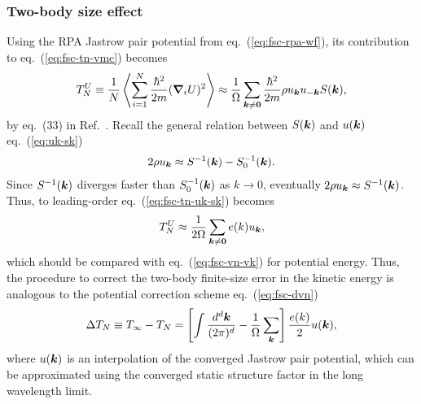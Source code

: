 \subsubsection{Two-body size effect}
Using the RPA Jastrow pair potential from eq.~(\ref{eq:fsc-rpa-wf}), its contribution to eq.~(\ref{eq:fsc-tn-vmc}) becomes
\begin{align} \label{eq:fsc-tn-uk-sk}
T^U_N \equiv \dfrac{1}{N}\left\langle
\sum\limits_{i=1}^N \dfrac{\hbar^2}{2m} (\boldsymbol{\nabla}_iU)^2
\right\rangle
\approx \frac{1}{\Omega} \sum\limits_{\boldsymbol{k}\neq\boldsymbol{0}}
 \dfrac{\hbar^2}{2m} \rho u_{\boldsymbol{k}}u_{-\boldsymbol{k}}S(\boldsymbol{k}),
\end{align}
by eq.~(33) in Ref.~\cite{Holzmann2016}.
Recall the general relation between $S(\boldsymbol{k})$ and $u(\boldsymbol{k})$ eq.~(\ref{eq:uk-sk})
\begin{align}
2\rho u_{\boldsymbol{k}} \approx S^{-1}(\boldsymbol{k}) - S^{-1}_0(\boldsymbol{k}).
\end{align}
Since $S^{-1}(\boldsymbol{k})$ diverges faster than $S_0^{-1}(\boldsymbol{k})$ as $k\rightarrow0$, eventually $2\rho u_{\boldsymbol{k}} \approx S^{-1}(\boldsymbol{k})$. Thus, to leading-order eq.~(\ref{eq:fsc-tn-uk-sk}) becomes
\begin{align} \label{eq:fsc-tn-uk-ek}
T_N^U \approx \dfrac{1}{2\Omega} \sum\limits_{\boldsymbol{k}\neq\boldsymbol{0}}
e(k)u_{\boldsymbol{k}},
\end{align}
which should be compared with eq.~(\ref{eq:fsc-vn-vk}) for potential energy. Thus, the procedure to correct the two-body finite-size error in the kinetic energy is analogous to the potential correction scheme eq.~(\ref{eq:fsc-dvn})
\begin{align} \label{eq:fsc-dtn-uk}
\Delta T_N \equiv T_{\infty} - T_N = \left[
\int \dfrac{d^d\boldsymbol{k}}{(2\pi)^d} - \dfrac{1}{\Omega}\sum\limits_{\boldsymbol{k}}
\right] \frac{e(k)}{2} u(\boldsymbol{k}),
\end{align}
where $u(\boldsymbol{k})$ is an interpolation of the converged Jastrow pair potential, which can be approximated using the converged static structure factor in the long wavelength limit.

